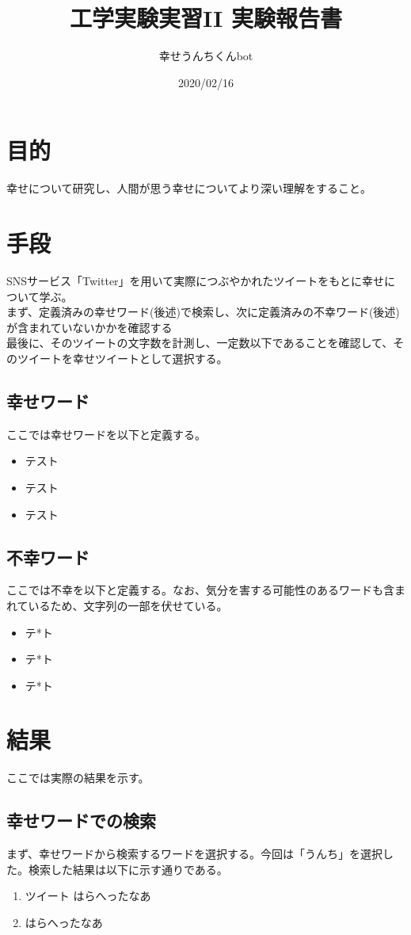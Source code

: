 \documentclass[a4j]{jarticle}
\title{工学実験実習II 実験報告書}
\author{幸せうんちくんbot}
\date{2020/02/16}
\begin{document}
\maketitle
\section{目的}
幸せについて研究し、人間が思う幸せについてより深い理解をすること。

\section{手段}
SNSサービス「Twitter」を用いて実際につぶやかれたツイートをもとに幸せについて学ぶ。 \\
まず、定義済みの幸せワード(後述)で検索し、次に定義済みの不幸ワード(後述)が含まれていないかかを確認する \\
\quad 最後に、そのツイートの文字数を計測し、一定数以下であることを確認して、そのツイートを幸せツイートとして選択する。

\subsection{幸せワード}
ここでは幸せワードを以下と定義する。
\begin{itemize}
  \item テスト
  \item テスト
  \item テスト
\end{itemize}

\subsection{不幸ワード}
ここでは不幸を以下と定義する。なお、気分を害する可能性のあるワードも含まれているため、文字列の一部を伏せている。
\begin{itemize}
  \item テ*ト
  \item テ*ト
  \item テ*ト
\end{itemize}


\section{結果}
ここでは実際の結果を示す。
\subsection{幸せワードでの検索}
まず、幸せワードから検索するワードを選択する。今回は「うんち」を選択した。検索した結果は以下に示す通りである。
\begin{enumerate}
\item 
\begin{itembox}[l]{ツイート}
  はらへったなあ
\end{itembox}

\item 
\begin{itembox}[l]{2}
  はらへったなあ
\end{itembox}

\end{enumerate}
\end{document}

